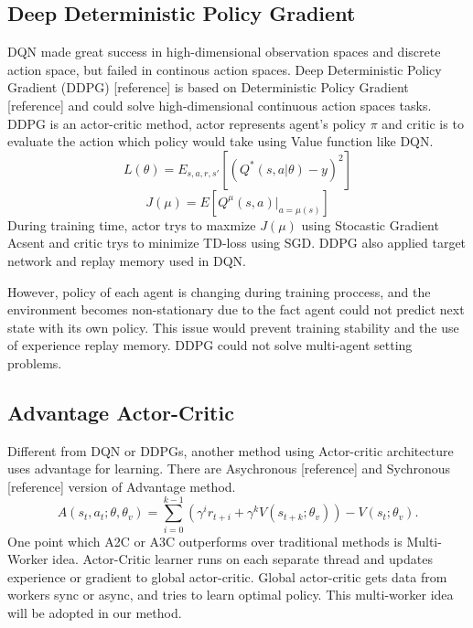 \documentclass[11pt,twocolumn]{jarticle} %
\begin{document}
\subsection{Deep Deterministic Policy Gradient}
DQN made great success in high-dimensional observation spaces and discrete action space, but failed in continous action spaces. Deep Deterministic Policy Gradient (DDPG) [reference] is based on Deterministic Policy Gradient [reference] and could solve high-dimensional continuous action spaces tasks. DDPG is an actor-critic method, actor represents agent's policy $\pi$ and critic is to evaluate the action which policy would take using Value function like DQN. 
\begin{equation}
L(\theta) = E_{s,a,r,s'}[(Q^*(s, a|\theta) - y)^2] 
\end{equation}
\begin{equation}
J(\mu) = E[Q^\mu(s, a) | _{a=\mu(s)}]
\end{equation}
During training time, actor trys to maxmize $J(\mu)$ using Stocastic Gradient Acsent and critic trys to minimize TD-loss using SGD. DDPG also applied target network and replay memory used in DQN. \par
However, policy of each agent is changing during training proccess, and the environment becomes non-stationary due to the fact agent could not predict next state with its own policy. This issue would prevent training stability and the use of experience replay memory. DDPG could not solve multi-agent setting problems.

\subsection{Advantage Actor-Critic}
Different from DQN or DDPGs, another method using Actor-critic architecture uses advantage for learning. 
There are Asychronous [reference] and Sychronous [reference] version of Advantage method. 
\begin{equation}
A(s_t, a_t; \theta, \theta_v) = \sum_{i=0}^{k-1}(\gamma^i r_{t+i} + \gamma^k V(s_{t+k};\theta_v)) - V(s_t; \theta_v).
\end{equation}
One point which A2C or A3C outperforms over traditional methods is Multi-Worker idea. Actor-Critic learner runs on each separate thread and updates experience or gradient to global actor-critic. Global actor-critic gets data from workers sync or async, and tries to learn optimal policy. This multi-worker idea will be adopted in our method.
\end{document}
